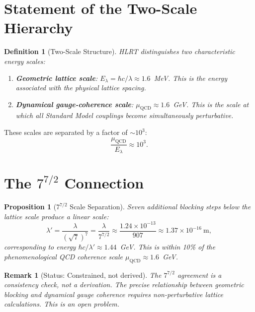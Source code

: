 \documentclass[11pt,letterpaper]{article}
\newtheorem{proposition}[theorem]{Proposition}
\newtheorem{definition}[theorem]{Definition}
\newtheorem{remark}[theorem]{Remark}
\begin{document}
\section{Statement of the Two-Scale Hierarchy}

\begin{definition}[Two-Scale Structure]
HLRT distinguishes two characteristic energy scales:
\begin{enumerate}[label=(\roman*),nosep]
  \item \textbf{Geometric lattice scale}: $E_\lambda = \hbar c/\lambda \approx 1.6$~MeV.
        This is the energy associated with the physical lattice spacing.
  \item \textbf{Dynamical gauge-coherence scale}: $\mu_\mathrm{QCD}\approx1.6$~GeV.
        This is the scale at which all Standard Model couplings become
        simultaneously perturbative.
\end{enumerate}
\end{definition}

These scales are separated by a factor of $\sim10^3$:
\begin{equation}
  \frac{\mu_\mathrm{QCD}}{E_\lambda} \approx 10^3.
\end{equation}

\section{The $7^{7/2}$ Connection}

\begin{proposition}[$7^{7/2}$ Scale Separation]
Seven additional blocking steps below the lattice scale produce a linear scale:
\begin{equation}
  \lambda' = \frac{\lambda}{(\sqrt{7})^7} = \frac{\lambda}{7^{7/2}}
  \approx \frac{1.24\times10^{-13}}{907}
  \approx 1.37\times10^{-16}~\text{m},
\end{equation}
corresponding to energy $\hbar c/\lambda'\approx1.44$~GeV.
This is within 10\% of the phenomenological QCD coherence scale
$\mu_\mathrm{QCD}\approx1.6$~GeV.
\end{proposition}

\begin{remark}[Status: Constrained, not derived]
The $7^{7/2}$ agreement is a \emph{consistency check}, not a derivation.
The precise relationship between geometric blocking and dynamical gauge
coherence requires non-perturbative lattice calculations.  This is an
open problem.
\end{remark}
\end{document}
